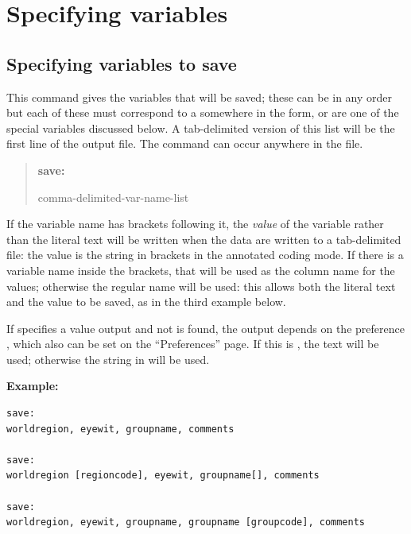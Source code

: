 \documentclass[letterpaper,10pt,english]{sphinxmanual}
\begin{document}
\section{Specifying variables}
\label{forms:specifying-variables}

\subsection{Specifying variables to save}
\label{forms:specifying-variables-to-save}
This command gives the variables that will be saved; these can be in any
order but each of these must correspond to a  somewhere in
the form, or are one of the special variables discussed below. A
tab-delimited version of this list will be the first line of the output
file. The command can occur anywhere in the file.
\begin{quote}

\begin{DUlineblock}{0em}
\item[] \textbf{save:}
\item[] comma-delimited-var-name-list
\end{DUlineblock}
\end{quote}

If the variable name has brackets following it, the \emph{value} of the
variable rather than the literal text will be written when the data are
written to a tab-delimited file: the value is the string in brackets
\code{{[}…{]}} in the annotated coding mode. If there is a variable name inside
the brackets, that will be used as the column name for the values;
otherwise the regular name will be used: this allows both the literal
text and the value to be saved, as in the third example below.

If  specifies a value output and not is found, the output depends
on the preference , which also can
be set on the “Preferences” page. If this is , the text will be
used; otherwise the string in   will be used.

\textbf{Example:}

\begin{Verbatim}[commandchars=\\\{\}]
save:
worldregion, eyewit, groupname, comments

save:
worldregion [regioncode], eyewit, groupname[], comments

save:
worldregion, eyewit, groupname, groupname [groupcode], comments
\end{Verbatim}
\end{document}
